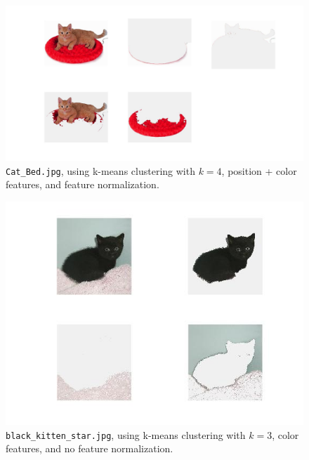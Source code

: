 \documentclass[12pt]{article}
\begin{document}
\begin{figure}[H]
	\centering
	\includegraphics[width=.95\textwidth]{succ2.jpg}
	\caption{\texttt{Cat\_Bed.jpg}, using k-means clustering with $k = 4$, position + color features, and feature normalization.}
\end{figure}

\begin{figure}[H]
	\centering
	\includegraphics[width=.95\textwidth]{succ3.jpg}
	\caption{\texttt{black\_kitten\_star.jpg}, using k-means clustering with $k = 3$, color features, and no feature normalization.}
\end{figure}
\end{document}
